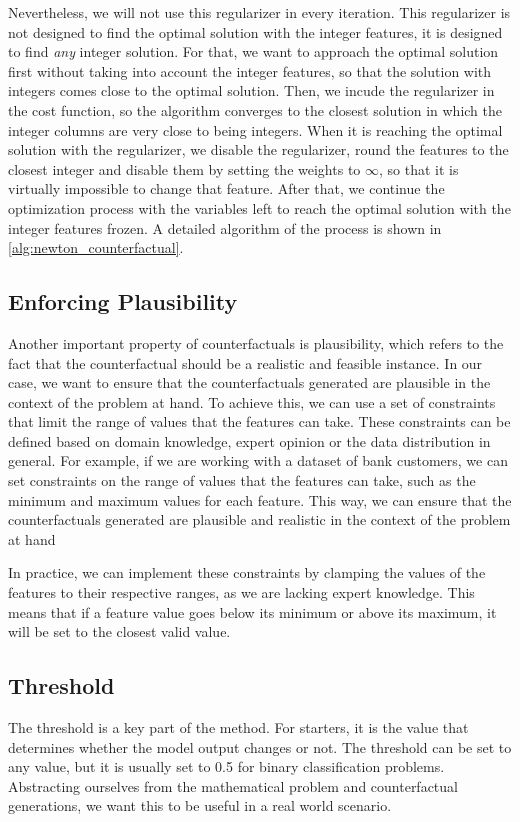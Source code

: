 \documentclass[12pt]{extarticle}
\numberwithin{equation}{section}
\begin{document}
Nevertheless, we will not use this regularizer in every iteration. This regularizer is not designed to find the optimal solution with the integer features, it is designed to find \emph{any} integer solution. For that, we want to approach the optimal solution first without taking into account the integer features, so that the solution with integers comes close to the optimal solution. Then, we incude the regularizer in the cost function, so the algorithm converges to the closest solution in which the integer columns are very close to being integers. When it is reaching the optimal solution with the regularizer, we disable the regularizer, round the features to the closest integer and disable them by setting the weights to $\infty$, so that it is virtually impossible to change that feature. After that, we continue the optimization process with the variables left to reach the optimal solution with the integer features frozen. A detailed algorithm of the process is shown in \autoref{alg:newton_counterfactual}.

\subsection{Enforcing Plausibility}\label{sec:enforcing_plausibility}
Another important property of counterfactuals is plausibility, which refers to the fact that the counterfactual should be a realistic and feasible instance. In our case, we want to ensure that the counterfactuals generated are plausible in the context of the problem at hand. To achieve this, we can use a set of constraints that limit the range of values that the features can take. These constraints can be defined based on domain knowledge, expert opinion or the data distribution in general. For example, if we are working with a dataset of bank customers, we can set constraints on the range of values that the features can take, such as the minimum and maximum values for each feature. This way, we can ensure that the counterfactuals generated are plausible and realistic in the context of the problem at hand

In practice, we can implement these constraints by clamping the values of the features to their respective ranges, as we are lacking expert knowledge. This means that if a feature value goes below its minimum or above its maximum, it will be set to the closest valid value. 

\subsection{Threshold}\label{sec:threshold}
The threshold is a key part of the method. For starters, it is the value that determines whether the model output changes or not. The threshold can be set to any value, but it is usually set to 0.5 for binary classification problems. Abstracting ourselves from the mathematical problem and counterfactual generations, we want this to be useful in a real world scenario. 
\end{document}
